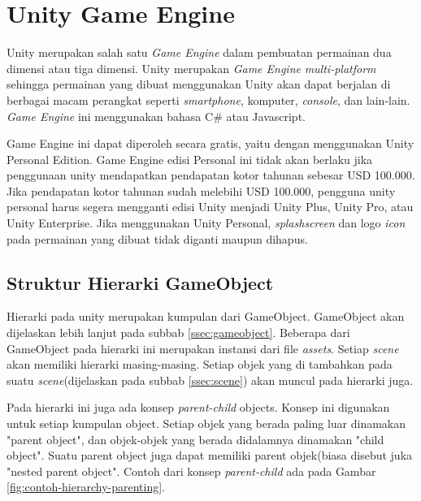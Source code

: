 \section{Unity Game Engine}
\label{sec:unity_game_engine}

Unity merupakan salah satu \textit{Game Engine} dalam pembuatan permainan dua dimensi atau tiga dimensi.\cite{unity} Unity merupakan \textit{Game Engine} \textit{multi-platform} sehingga permainan yang dibuat menggunakan Unity akan dapat berjalan di berbagai macam perangkat seperti \textit{smartphone}, komputer, \textit{console}, dan lain-lain.  \textit{Game Engine} ini menggunakan bahasa C\# atau Javascript.

Game Engine ini dapat diperoleh secara gratis, yaitu dengan menggunakan Unity Personal Edition. Game Engine edisi Personal ini tidak akan berlaku jika penggunaan unity mendapatkan pendapatan kotor tahunan sebesar USD 100.000. Jika pendapatan kotor tahunan sudah melebihi USD 100.000, pengguna unity personal harus segera mengganti edisi Unity menjadi Unity Plus, Unity Pro, atau Unity Enterprise. Jika menggunakan Unity Personal, \textit{splashscreen} dan logo \textit{icon} pada permainan yang dibuat tidak diganti maupun dihapus. 


 \subsection{Struktur Hierarki GameObject}
 \label{ssec:struktur_hierarki_gameobject}
 
 Hierarki pada unity merupakan kumpulan dari GameObject. \cite{unity_manual} GameObject akan dijelaskan lebih lanjut pada subbab \ref{ssec:gameobject}. Beberapa dari GameObject pada hierarki ini merupakan instansi dari file \textit{assets}. Setiap \textit{scene} akan memiliki hierarki masing-masing. Setiap objek yang di tambahkan pada suatu \textit{scene}(dijelaskan pada subbab \ref{ssec:scene}) akan muncul pada hierarki juga.
 
 Pada hierarki ini juga ada konsep \textit{parent-child} objects. Konsep ini digunakan untuk setiap kumpulan object. Setiap objek yang berada paling luar dinamakan "parent object", dan objek-objek  yang berada didalamnya dinamakan "child object". Suatu parent object juga dapat memiliki parent objek(biasa disebut juka "nested parent object". Contoh dari konsep \textit{parent-child} ada pada Gambar \ref{fig:contoh-hierarchy-parenting}.
 
